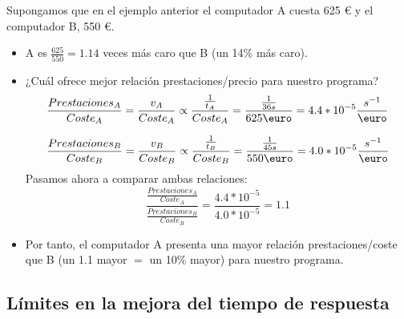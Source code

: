 \documentclass[12pt,spanish]{article}
\begin{document}
Supongamos que en el ejemplo anterior el computador A cuesta 625 \textup{\euro} y el computador B, 550 \textup{\euro}.
\begin{itemize}
	\item A es $\frac{625}{550}=1.14$ veces más caro que B (un 14\% más caro).
	\item ¿Cuál ofrece mejor relación prestaciones/precio para nuestro programa?
	\[
		\frac{Prestaciones_A}{Coste_A}=\frac{v_A}{Coste_A} \propto \frac{\frac{1}{t_A}}{Coste_A}=\frac{\frac{1}{36 s}}{625 \textup{\euro}} = 4.4 * 10^{-5} \frac{s^{-1}}{\textup{\euro}}
	\]

	\[
		\frac{Prestaciones_B}{Coste_B}=\frac{v_B}{Coste_B} \propto \frac{\frac{1}{t_B}}{Coste_B}=\frac{\frac{1}{45 s}}{550 \textup{\euro}} = 4.0 * 10^{-5} \frac{s^{-1}}{\textup{\euro}}
	\]
	Pasamos ahora a comparar ambas relaciones:
	\[
	\frac{\frac{Prestaciones_A}{Coste_A}}{\frac{Prestaciones_B}{Coste_B}} = \frac{4.4 * 10^{-5}}{4.0 * 10^{-5}} = 1.1
	\]
	\item Por tanto, el computador A presenta una mayor relación prestaciones/coste que B (un 1.1 mayor $=$ un 10\% mayor) para nuestro programa.
\end{itemize}


\subsection{Límites en la mejora del tiempo de respuesta}
\end{document}
